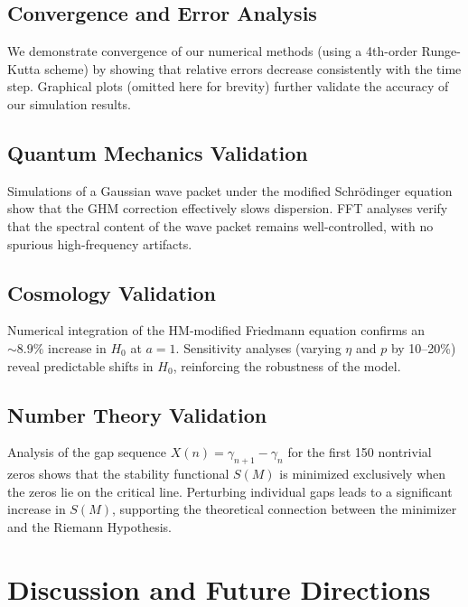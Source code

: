 \documentclass[11pt]{article}
\begin{document}
\medskip

\subsection{Convergence and Error Analysis}

We demonstrate convergence of our numerical methods (using a 4th-order Runge-Kutta scheme) by showing that relative errors decrease consistently with the time step. Graphical plots (omitted here for brevity) further validate the accuracy of our simulation results.

\subsection{Quantum Mechanics Validation}

Simulations of a Gaussian wave packet under the modified Schr\"odinger equation show that the GHM correction effectively slows dispersion. FFT analyses verify that the spectral content of the wave packet remains well-controlled, with no spurious high-frequency artifacts.

\subsection{Cosmology Validation}

Numerical integration of the HM-modified Friedmann equation confirms an $\sim8.9\%$ increase in $H_0$ at $a=1$. Sensitivity analyses (varying $\eta$ and $p$ by 10--20\%) reveal predictable shifts in $H_0$, reinforcing the robustness of the model.

\subsection{Number Theory Validation}

Analysis of the gap sequence $X(n)=\gamma_{n+1}-\gamma_n$ for the first 150 nontrivial zeros shows that the stability functional $S(M)$ is minimized exclusively when the zeros lie on the critical line. Perturbing individual gaps leads to a significant increase in $S(M)$, supporting the theoretical connection between the minimizer and the Riemann Hypothesis.

\section{Discussion and Future Directions}
\end{document}
